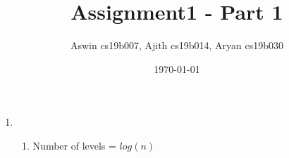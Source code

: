 \documentclass[12pt]{article}
\title{Assignment1 - Part 1}
\author{Aswin cs19b007, Ajith cs19b014, Aryan cs19b030}
\date{\today}
\begin{document}
\maketitle

\newpage
\begin{enumerate}
    \item\begin{enumerate}
        \item Number of levels = $log(n)$
    \end{enumerate}
\end{enumerate}
\end{document}

